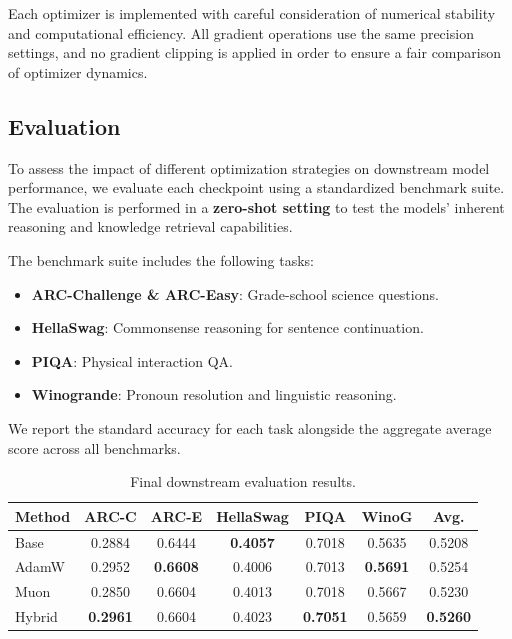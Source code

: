 \documentclass[11pt,a4paper]{article}
\begin{document}
Each optimizer is implemented with careful consideration of numerical stability
and computational efficiency. All gradient operations use the same precision
settings, and no gradient clipping is applied in order to ensure a fair
comparison of optimizer dynamics.


\subsection{Evaluation}

To assess the impact of different optimization strategies on downstream model
performance, we evaluate each checkpoint using a standardized benchmark suite.
The evaluation is performed in a \textbf{zero-shot setting}
to test the models' inherent reasoning and knowledge
retrieval capabilities.

The benchmark suite includes the following tasks:
\begin{itemize}[leftmargin=1.5em, itemsep=0pt]
	\item \textbf{ARC-Challenge \& ARC-Easy}: Grade-school science questions.
	\item \textbf{HellaSwag}: Commonsense reasoning for sentence continuation.
	\item \textbf{PIQA}: Physical interaction QA.
	\item \textbf{Winogrande}: Pronoun resolution and linguistic reasoning.
\end{itemize}

We report the standard accuracy for each task alongside the aggregate average
score across all benchmarks.

\begin{table}[H]
	\centering
	\caption{Final downstream evaluation results.}
	\label{tab:evals}
	\begin{tabular}{lcccccc}
		\toprule
		\textbf{Method} & \textbf{ARC-C}  & \textbf{ARC-E}  & \textbf{HellaSwag} & \textbf{PIQA}   & \textbf{WinoG}  & \textbf{Avg.}   \\
		\midrule
		Base            & 0.2884          & 0.6444          & \textbf{0.4057}    & 0.7018          & 0.5635          & 0.5208          \\
		AdamW           & 0.2952          & \textbf{0.6608} & 0.4006             & 0.7013          & \textbf{0.5691} & 0.5254          \\
		Muon            & 0.2850          & 0.6604          & 0.4013             & 0.7018          & 0.5667          & 0.5230          \\
		Hybrid          & \textbf{0.2961} & 0.6604          & 0.4023             & \textbf{0.7051} & 0.5659          & \textbf{0.5260} \\
		\bottomrule
	\end{tabular}

\end{table}
\end{document}
